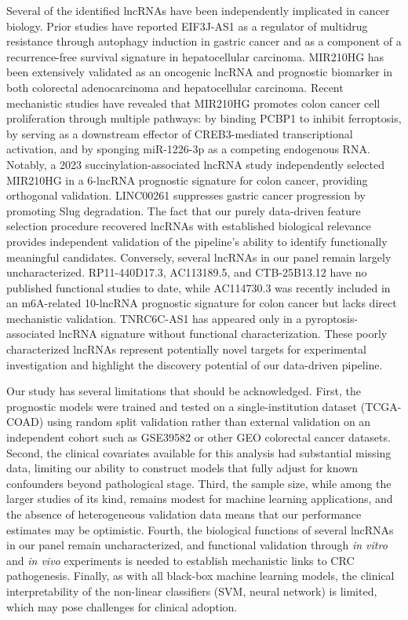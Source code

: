 \documentclass[fleqn,10pt]{wlscirep}
\begin{document}
Several of the identified lncRNAs have been independently implicated in cancer biology. Prior studies have reported EIF3J-AS1 as a regulator of multidrug resistance through autophagy induction in gastric cancer\cite{RN20} and as a component of a recurrence-free survival signature in hepatocellular carcinoma\cite{RN21}. MIR210HG has been extensively validated as an oncogenic lncRNA and prognostic biomarker in both colorectal adenocarcinoma and hepatocellular carcinoma\cite{RN22,RN23}. Recent mechanistic studies have revealed that MIR210HG promotes colon cancer cell proliferation through multiple pathways: by binding PCBP1 to inhibit ferroptosis, by serving as a downstream effector of CREB3-mediated transcriptional activation, and by sponging miR-1226-3p as a competing endogenous RNA. Notably, a 2023 succinylation-associated lncRNA study independently selected MIR210HG in a 6-lncRNA prognostic signature for colon cancer, providing orthogonal validation. LINC00261 suppresses gastric cancer progression by promoting Slug degradation\cite{RN24}. The fact that our purely data-driven feature selection procedure recovered lncRNAs with established biological relevance provides independent validation of the pipeline's ability to identify functionally meaningful candidates. Conversely, several lncRNAs in our panel remain largely uncharacterized. RP11-440D17.3, AC113189.5, and CTB-25B13.12 have no published functional studies to date, while AC114730.3 was recently included in an m6A-related 10-lncRNA prognostic signature for colon cancer but lacks direct mechanistic validation. TNRC6C-AS1 has appeared only in a pyroptosis-associated lncRNA signature without functional characterization. These poorly characterized lncRNAs represent potentially novel targets for experimental investigation and highlight the discovery potential of our data-driven pipeline.

Our study has several limitations that should be acknowledged. First, the prognostic models were trained and tested on a single-institution dataset (TCGA-COAD) using random split validation rather than external validation on an independent cohort such as GSE39582 or other GEO colorectal cancer datasets. Second, the clinical covariates available for this analysis had substantial missing data, limiting our ability to construct models that fully adjust for known confounders beyond pathological stage. Third, the sample size, while among the larger studies of its kind, remains modest for machine learning applications, and the absence of heterogeneous validation data means that our performance estimates may be optimistic. Fourth, the biological functions of several lncRNAs in our panel remain uncharacterized, and functional validation through \textit{in vitro} and \textit{in vivo} experiments is needed to establish mechanistic links to CRC pathogenesis. Finally, as with all black-box machine learning models, the clinical interpretability of the non-linear classifiers (SVM, neural network) is limited, which may pose challenges for clinical adoption.
\end{document}
